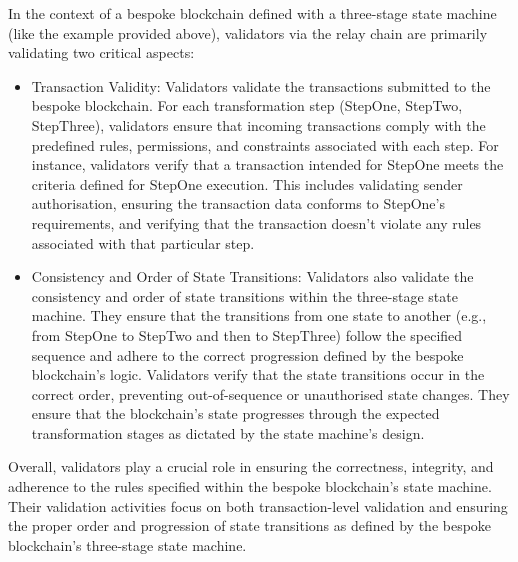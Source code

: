 \documentclass{tufte-handout}
\begin{document}
In the context of a bespoke blockchain defined with a three-stage state machine (like the example provided above), validators via the relay chain are primarily
validating two critical aspects:
\begin{itemize}
\item Transaction Validity:
Validators validate the transactions submitted to the bespoke blockchain. For each transformation step (StepOne, StepTwo, StepThree), validators ensure
that incoming transactions comply with the predefined rules, permissions, and constraints associated with each step.
For instance, validators verify that a transaction intended for StepOne meets the criteria defined for StepOne execution. This includes validating sender
authorisation, ensuring the transaction data conforms to StepOne's requirements, and verifying that the transaction doesn't violate any rules associated
with that particular step.
\item Consistency and Order of State Transitions:
Validators also validate the consistency and order of state transitions within the three-stage state machine. They ensure that the transitions from one
state to another (e.g., from StepOne to StepTwo and then to StepThree) follow the specified sequence and adhere to the correct progression defined by
the bespoke blockchain's logic.
Validators verify that the state transitions occur in the correct order, preventing out-of-sequence or unauthorised state changes. They ensure that the
blockchain's state progresses through the expected transformation stages as dictated by the state machine's design.
\end{itemize}
Overall, validators play a crucial role in ensuring the correctness, integrity, and adherence to the rules specified within the bespoke blockchain's
state machine. Their validation activities focus on both transaction-level validation and ensuring the proper order and progression of state transitions
as defined by the bespoke blockchain's three-stage state machine.

\end{document}
